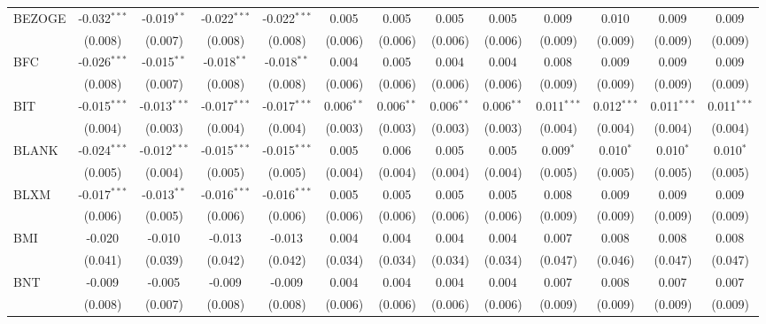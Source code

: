 \begin{table}[!htbp]
\begin{tabular}{@{\extracolsep{5pt}}lcccccccccccc}
 BEZOGE & -0.032$^{***}$ & -0.019$^{**}$ & -0.022$^{***}$ & -0.022$^{***}$ & 0.005$^{}$ & 0.005$^{}$ & 0.005$^{}$ & 0.005$^{}$ & 0.009$^{}$ & 0.010$^{}$ & 0.009$^{}$ & 0.009$^{}$ \\
  & (0.008) & (0.007) & (0.008) & (0.008) & (0.006) & (0.006) & (0.006) & (0.006) & (0.009) & (0.009) & (0.009) & (0.009) \\
 BFC & -0.026$^{***}$ & -0.015$^{**}$ & -0.018$^{**}$ & -0.018$^{**}$ & 0.004$^{}$ & 0.005$^{}$ & 0.004$^{}$ & 0.004$^{}$ & 0.008$^{}$ & 0.009$^{}$ & 0.009$^{}$ & 0.009$^{}$ \\
  & (0.008) & (0.007) & (0.008) & (0.008) & (0.006) & (0.006) & (0.006) & (0.006) & (0.009) & (0.009) & (0.009) & (0.009) \\
 BIT & -0.015$^{***}$ & -0.013$^{***}$ & -0.017$^{***}$ & -0.017$^{***}$ & 0.006$^{**}$ & 0.006$^{**}$ & 0.006$^{**}$ & 0.006$^{**}$ & 0.011$^{***}$ & 0.012$^{***}$ & 0.011$^{***}$ & 0.011$^{***}$ \\
  & (0.004) & (0.003) & (0.004) & (0.004) & (0.003) & (0.003) & (0.003) & (0.003) & (0.004) & (0.004) & (0.004) & (0.004) \\
 BLANK & -0.024$^{***}$ & -0.012$^{***}$ & -0.015$^{***}$ & -0.015$^{***}$ & 0.005$^{}$ & 0.006$^{}$ & 0.005$^{}$ & 0.005$^{}$ & 0.009$^{*}$ & 0.010$^{*}$ & 0.010$^{*}$ & 0.010$^{*}$ \\
  & (0.005) & (0.004) & (0.005) & (0.005) & (0.004) & (0.004) & (0.004) & (0.004) & (0.005) & (0.005) & (0.005) & (0.005) \\
 BLXM & -0.017$^{***}$ & -0.013$^{**}$ & -0.016$^{***}$ & -0.016$^{***}$ & 0.005$^{}$ & 0.005$^{}$ & 0.005$^{}$ & 0.005$^{}$ & 0.008$^{}$ & 0.009$^{}$ & 0.009$^{}$ & 0.009$^{}$ \\
  & (0.006) & (0.005) & (0.006) & (0.006) & (0.006) & (0.006) & (0.006) & (0.006) & (0.009) & (0.009) & (0.009) & (0.009) \\
 BMI & -0.020$^{}$ & -0.010$^{}$ & -0.013$^{}$ & -0.013$^{}$ & 0.004$^{}$ & 0.004$^{}$ & 0.004$^{}$ & 0.004$^{}$ & 0.007$^{}$ & 0.008$^{}$ & 0.008$^{}$ & 0.008$^{}$ \\
  & (0.041) & (0.039) & (0.042) & (0.042) & (0.034) & (0.034) & (0.034) & (0.034) & (0.047) & (0.046) & (0.047) & (0.047) \\
 BNT & -0.009$^{}$ & -0.005$^{}$ & -0.009$^{}$ & -0.009$^{}$ & 0.004$^{}$ & 0.004$^{}$ & 0.004$^{}$ & 0.004$^{}$ & 0.007$^{}$ & 0.008$^{}$ & 0.007$^{}$ & 0.007$^{}$ \\
  & (0.008) & (0.007) & (0.008) & (0.008) & (0.006) & (0.006) & (0.006) & (0.006) & (0.009) & (0.009) & (0.009) & (0.009) \\

\end{tabular}
\end{table}
